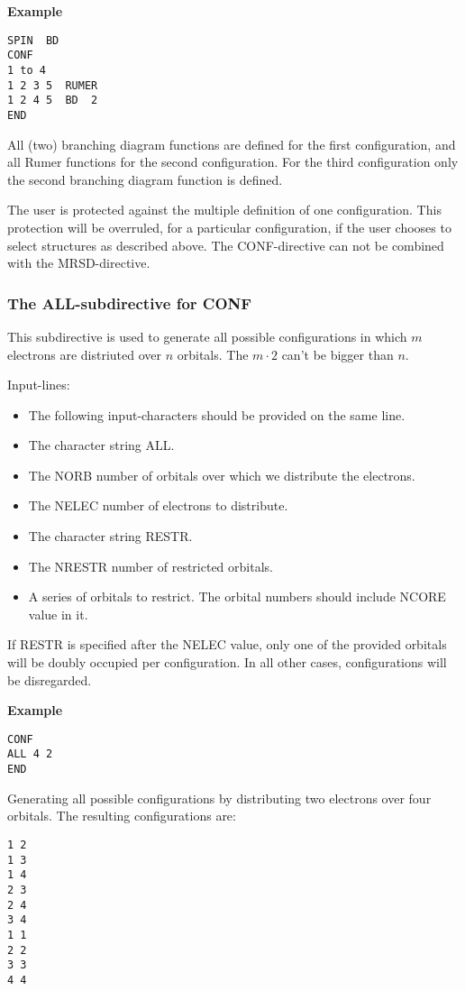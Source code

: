 \documentclass[11pt,fleqn]{article}
\begin{document}
{\bf Example}
\begin{verbatim}
SPIN  BD
CONF
1 to 4
1 2 3 5  RUMER
1 2 4 5  BD  2
END
\end{verbatim}

All (two) branching diagram functions are defined for the first configuration, 
and all Rumer functions for the second configuration. For the third configuration 
only the second branching diagram function is defined.

The user is protected against the multiple definition of one configuration. 
This protection will be overruled, for a particular configuration, if the user 
chooses to select structures as described above. 
The CONF-directive can not be combined with the MRSD-directive. 

\subsubsection{The ALL-subdirective for CONF}

This subdirective is used to generate all possible configurations in which 
$m$ electrons are distriuted over $n$ orbitals. The $m \cdot 2$ can't be
bigger than $n$.

Input-lines:
\begin{itemize}
\item The following input-characters should be provided on the same line.
\item The character string ALL.
\item The NORB number of orbitals over which we distribute the electrons.
\item The NELEC number of electrons to distribute.
\item The character string RESTR.
\item The NRESTR number of restricted orbitals.
\item A series of orbitals to restrict. The orbital numbers should include
NCORE value in it.
\end{itemize}

If RESTR is specified after the NELEC value, only one of the provided orbitals
will be doubly occupied per configuration. In all other cases, configurations 
will be disregarded.

{\bf Example}
\begin{verbatim}
CONF
ALL 4 2
END
\end{verbatim}

Generating all possible configurations by distributing two electrons over
four orbitals. The resulting configurations are:
\begin{verbatim}
1 2
1 3
1 4
2 3
2 4
3 4
1 1
2 2
3 3
4 4
\end{verbatim}
\end{document}
